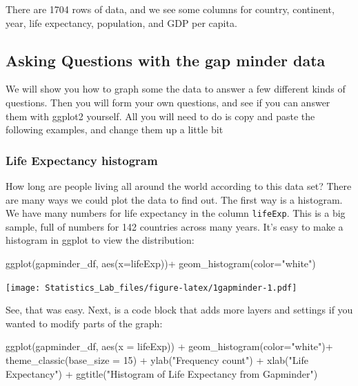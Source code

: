 \documentclass[
]{book}
\newenvironment{Shaded}{\begin{snugshade}}{\end{snugshade}}
\newcommand{\AttributeTok}[1]{\textcolor[rgb]{0.77,0.63,0.00}{#1}}
\newcommand{\DecValTok}[1]{\textcolor[rgb]{0.00,0.00,0.81}{#1}}
\newcommand{\FunctionTok}[1]{\textcolor[rgb]{0.00,0.00,0.00}{#1}}
\newcommand{\NormalTok}[1]{#1}
\newcommand{\SpecialCharTok}[1]{\textcolor[rgb]{0.00,0.00,0.00}{#1}}
\newcommand{\StringTok}[1]{\textcolor[rgb]{0.31,0.60,0.02}{#1}}
\begin{document}
There are 1704 rows of data, and we see some columns for country, continent, year, life expectancy, population, and GDP per capita.

\hypertarget{asking-questions-with-the-gap-minder-data}{%
\subsection{Asking Questions with the gap minder data}\label{asking-questions-with-the-gap-minder-data}}

We will show you how to graph some the data to answer a few different kinds of questions. Then you will form your own questions, and see if you can answer them with ggplot2 yourself. All you will need to do is copy and paste the following examples, and change them up a little bit

\hypertarget{life-expectancy-histogram}{%
\subsubsection{Life Expectancy histogram}\label{life-expectancy-histogram}}

How long are people living all around the world according to this data set? There are many ways we could plot the data to find out. The first way is a histogram. We have many numbers for life expectancy in the column \texttt{lifeExp}. This is a big sample, full of numbers for 142 countries across many years. It's easy to make a histogram in ggplot to view the distribution:

\begin{Shaded}
\begin{Highlighting}[]
\FunctionTok{ggplot}\NormalTok{(gapminder\_df, }\FunctionTok{aes}\NormalTok{(}\AttributeTok{x=}\NormalTok{lifeExp))}\SpecialCharTok{+}
  \FunctionTok{geom\_histogram}\NormalTok{(}\AttributeTok{color=}\StringTok{"white"}\NormalTok{)}
\end{Highlighting}
\end{Shaded}

\texttt{[image: Statistics\_Lab\_files/figure-latex/1gapminder-1.pdf]}

See, that was easy. Next, is a code block that adds more layers and settings if you wanted to modify parts of the graph:

\begin{Shaded}
\begin{Highlighting}[]
\FunctionTok{ggplot}\NormalTok{(gapminder\_df, }\FunctionTok{aes}\NormalTok{(}\AttributeTok{x =}\NormalTok{ lifeExp)) }\SpecialCharTok{+}
  \FunctionTok{geom\_histogram}\NormalTok{(}\AttributeTok{color=}\StringTok{"white"}\NormalTok{)}\SpecialCharTok{+} 
  \FunctionTok{theme\_classic}\NormalTok{(}\AttributeTok{base\_size =} \DecValTok{15}\NormalTok{) }\SpecialCharTok{+}
  \FunctionTok{ylab}\NormalTok{(}\StringTok{"Frequency count"}\NormalTok{) }\SpecialCharTok{+} 
  \FunctionTok{xlab}\NormalTok{(}\StringTok{"Life Expectancy"}\NormalTok{) }\SpecialCharTok{+}
  \FunctionTok{ggtitle}\NormalTok{(}\StringTok{"Histogram of Life Expectancy from Gapminder"}\NormalTok{)}
\end{Highlighting}
\end{Shaded}
\end{document}
